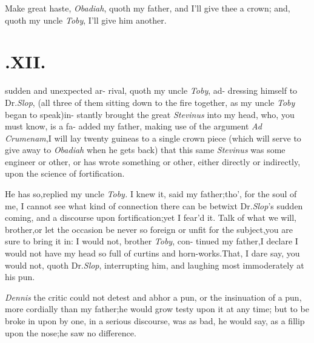 \documentclass{article}
\begin{document}
\tsh Make great haste, \textit{Obadiah}, quoth my father,
and I’ll give thee a crown;\tsk\break
and, quoth my uncle \textit{Toby}, I’ll give him another.

\null
\section{.\enspace  XII.}

 sudden and unexpected ar-\break
rival, quoth my uncle \textit{Toby}, ad-\break
dressing himself to Dr.\@ \textit{Slop},
(all three of them sitting down to the fire together, as my uncle
\textit{Toby} began to speak)\tsk in-\break
stantly brought the great \textit{Stevinus} into\break
my head, who, you must know, is a fa-
added my father, making use of the ar\-gument \textit{Ad
Crumenam},\tsh I will lay\break
twenty guineas to a single crown piece (which will serve to
give away to \textit{Obadiah} when he gets back) that this
same \textit{Stevinus} was some engineer or other,\tsk\break
or has wrote something or other, either directly or indirectly,
upon the science of\break
fortification.

He has so,\tsk replied my uncle \textit{Toby.}\tsk\break
I knew it, said my father;\tsk tho’, for the soul of me, I cannot see what kind
of connection there can be betwixt Dr.\@ \textit{Slop}’s sudden
coming, and a discourse upon fortification;\tsk yet I
fear’d it.\tsk\break
Talk of what we will, brother,\tsk or let the occasion be
never so foreign or unfit for the subject,\tsk you are sure
to bring it in: I would not, brother \textit{Toby}, con-
tinued my father,\tsh I declare I would not have my head
so full of curtins and horn-works.\tsh That, I dare say, you
would not, quoth Dr.\@ \textit{Slop}, interrupting him, and
laughing most immoderately at\break
his pun.

\textit{Dennis} the critic could not detest and abhor a pun, or
the insinuation of a pun, more cordially than my father;\tsh he
would grow testy upon it at any time;\tsk\break
but to be broke in upon by one, in a serious discourse, was
as bad, he would say, as a fillip upon the nose;\tsh he saw\break
no difference.
\end{document}
